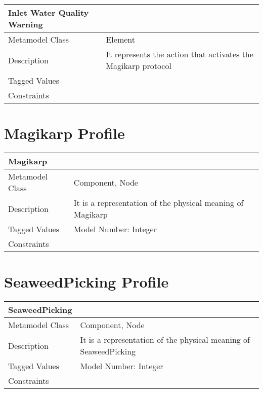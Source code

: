\begin{longtable}{|p{4cm}|p{9cm}|}

\hline
\textbf{Inlet Water Quality Warning} & \\


\hline
Metamodel Class & Element\\

\hline
Description & It represents the action that activates the Magikarp protocol\\

\hline
Tagged Values &\\

\hline
Constraints &\\

\hline
\end{longtable}

\section{Magikarp Profile}

\begin{longtable}{|p{4cm}|p{9cm}|}

\hline
\textbf{Magikarp} & \\


\hline
Metamodel Class & Component, Node\\

\hline
Description & It is a representation of the physical meaning of Magikarp\\

\hline
Tagged Values & Model Number: Integer\\

\hline
Constraints &\\

\hline
\end{longtable}

\section{SeaweedPicking Profile}

\begin{longtable}{|p{4cm}|p{9cm}|}

\hline
\textbf{SeaweedPicking} & \\


\hline
Metamodel Class & Component, Node\\

\hline
Description & It is a representation of the physical meaning of SeaweedPicking\\

\hline
Tagged Values & Model Number: Integer\\

\hline
Constraints &\\

\hline
\end{longtable}

